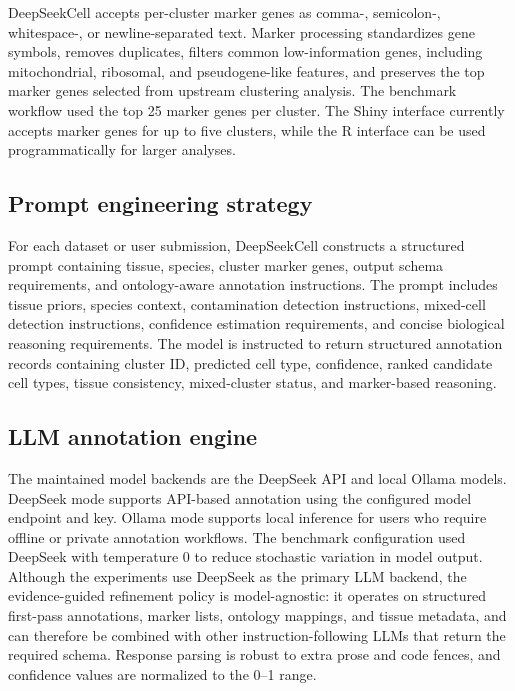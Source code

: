 \documentclass[referee,lineno,pdflatex]{sn-jnl}
\begin{document}
DeepSeekCell accepts per-cluster marker genes as comma-, semicolon-, whitespace-, or newline-separated text. Marker processing standardizes gene symbols, removes duplicates, filters common low-information genes, including mitochondrial, ribosomal, and pseudogene-like features, and preserves the top marker genes selected from upstream clustering analysis. The benchmark workflow used the top 25 marker genes per cluster. The Shiny interface currently accepts marker genes for up to five clusters, while the R interface can be used programmatically for larger analyses.

\subsection{Prompt engineering strategy}

For each dataset or user submission, DeepSeekCell constructs a structured prompt containing tissue, species, cluster marker genes, output schema requirements, and ontology-aware annotation instructions. The prompt includes tissue priors, species context, contamination detection instructions, mixed-cell detection instructions, confidence estimation requirements, and concise biological reasoning requirements. The model is instructed to return structured annotation records containing cluster ID, predicted cell type, confidence, ranked candidate cell types, tissue consistency, mixed-cluster status, and marker-based reasoning.

\subsection{LLM annotation engine}

The maintained model backends are the DeepSeek API and local Ollama models. DeepSeek mode supports API-based annotation using the configured model endpoint and key. Ollama mode supports local inference for users who require offline or private annotation workflows. The benchmark configuration used DeepSeek with temperature 0 to reduce stochastic variation in model output. Although the experiments use DeepSeek as the primary LLM backend, the evidence-guided refinement policy is model-agnostic: it operates on structured first-pass annotations, marker lists, ontology mappings, and tissue metadata, and can therefore be combined with other instruction-following LLMs that return the required schema. Response parsing is robust to extra prose and code fences, and confidence values are normalized to the 0--1 range.
\end{document}

